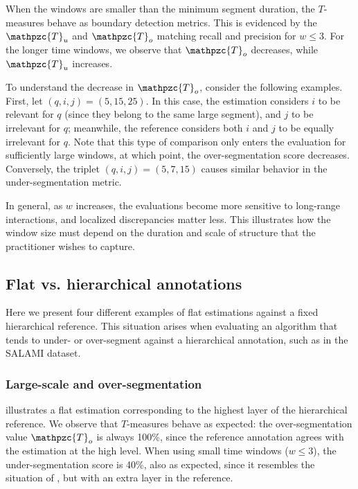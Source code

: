 \documentclass{article}
\def\shag{\ensuremath{\mathpzc{T}}}
\begin{document}
When the windows are smaller than the minimum segment duration, the $T$-measures behave as boundary detection metrics.
This is evidenced by the $\shag_u$ and $\shag_o$ matching recall and precision for $w \leq 3$.
For the longer time windows, we observe that $\shag_o$ decreases, while $\shag_u$ increases.

To understand the decrease in $\shag_o$, consider the following examples.
First, let $(q,i,j) = (5,15,25)$.
In this case, the estimation considers $i$ to be relevant for $q$ (since they belong to the same large segment), and $j$ to be irrelevant for $q$; meanwhile, the reference considers both $i$ and $j$ to be equally irrelevant for $q$.
Note that this type of comparison only enters the evaluation for sufficiently large windows, at which point, the over-segmentation score decreases.  
Conversely, the triplet $(q,i,j) = (5, 7, 15)$ causes similar behavior in the under-segmentation metric.

In general, as $w$ increases, the evaluations become more sensitive to long-range interactions, and localized discrepancies matter less.
This illustrates how the window size must depend on the duration and scale of structure that the practitioner wishes to capture. 

\subsection{Flat vs. hierarchical annotations}

Here we present four different examples of flat estimations against a fixed hierarchical reference.
This situation arises when evaluating an algorithm that tends to under- or over-segment against a
hierarchical annotation, such as in the SALAMI dataset.

\subsubsection{Large-scale and over-segmentation}

 illustrates a flat estimation corresponding to the highest layer of the hierarchical reference.
We observe that $T$-measures behave as expected: the over-segmentation value $\shag_o$ is always 100\%, since the reference annotation agrees with the estimation at the high level.
When using small time windows ($w \leq 3$), the under-segmentation score is 40\%, also as expected, since it
resembles the situation of , but with an extra layer in the reference.
\end{document}

